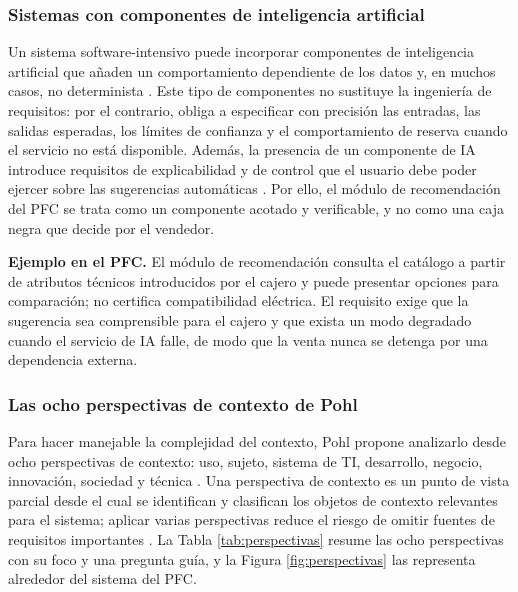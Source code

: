 \documentclass[onecolumn,12pt,a4paper]{IEEEtran}
\begin{document}
\subsubsection{Sistemas con componentes de inteligencia artificial}
Un sistema software-intensivo puede incorporar componentes de inteligencia artificial que a\~naden un comportamiento dependiente de los datos y, en muchos casos, no determinista \cite{pohl2025,swebok4}. Este tipo de componentes no sustituye la ingenier\'ia de requisitos: por el contrario, obliga a especificar con precisi\'on las entradas, las salidas esperadas, los l\'imites de confianza y el comportamiento de reserva cuando el servicio no est\'a disponible. Adem\'as, la presencia de un componente de IA introduce requisitos de explicabilidad y de control que el usuario debe poder ejercer sobre las sugerencias autom\'aticas \cite{swebok4}. Por ello, el m\'odulo de recomendaci\'on del PFC se trata como un componente acotado y verificable, y no como una caja negra que decide por el vendedor.

\textbf{Ejemplo en el PFC.} El m\'odulo de recomendaci\'on consulta el cat\'alogo a partir de atributos t\'ecnicos introducidos por el cajero y puede presentar opciones para comparaci\'on; no certifica compatibilidad el\'ectrica. El requisito exige que la sugerencia sea comprensible para el cajero y que exista un modo degradado cuando el servicio de IA falle, de modo que la venta nunca se detenga por una dependencia externa.

\subsubsection{Las ocho perspectivas de contexto de Pohl}
Para hacer manejable la complejidad del contexto, Pohl propone analizarlo desde ocho perspectivas de contexto: uso, sujeto, sistema de TI, desarrollo, negocio, innovaci\'on, sociedad y t\'ecnica \cite{pohl2025}. Una perspectiva de contexto es un punto de vista parcial desde el cual se identifican y clasifican los objetos de contexto relevantes para el sistema; aplicar varias perspectivas reduce el riesgo de omitir fuentes de requisitos importantes \cite{pohl2025}. La Tabla \ref{tab:perspectivas} resume las ocho perspectivas con su foco y una pregunta gu\'ia, y la Figura \ref{fig:perspectivas} las representa alrededor del sistema del PFC.
\end{document}
